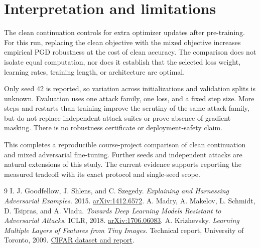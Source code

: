 \documentclass[10pt,a4paper]{article}
\begin{document}
\section{Interpretation and limitations}
The clean continuation controls for extra optimizer updates after pre-training.
For this run, replacing the clean objective with the mixed objective increases
empirical PGD robustness at the cost of clean accuracy. The comparison does not
isolate equal computation, nor does it establish that the selected loss weight,
learning rates, training length, or architecture are optimal.

Only seed 42 is reported, so variation across initializations and validation
splits is unknown. Evaluation uses one attack family, one loss, and a fixed step
size. More steps and restarts than training improve the scrutiny of the same
attack family, but do not replace independent attack suites or prove absence of
gradient masking. There is no robustness certificate or deployment-safety claim.

This completes a reproducible course-project comparison of clean continuation
and mixed adversarial fine-tuning. Further seeds and independent attacks are
natural extensions of this study. The current evidence supports reporting the
measured tradeoff with its exact protocol and single-seed scope.

\begin{thebibliography}{9}
\small
{} I. J. Goodfellow, J. Shlens, and C. Szegedy.
\textit{Explaining and Harnessing Adversarial Examples}. 2015.
\href{https://arxiv.org/abs/1412.6572}{arXiv:1412.6572}.
 A. Madry, A. Makelov, L. Schmidt, D. Tsipras, and A. Vladu.
\textit{Towards Deep Learning Models Resistant to Adversarial Attacks}. ICLR, 2018.
\href{https://arxiv.org/abs/1706.06083}{arXiv:1706.06083}.
 A. Krizhevsky. \textit{Learning Multiple Layers of Features from
Tiny Images}. Technical report, University of Toronto, 2009.
\href{https://www.cs.toronto.edu/~kriz/cifar.html}{CIFAR dataset and report}.
\end{thebibliography}
\end{document}

